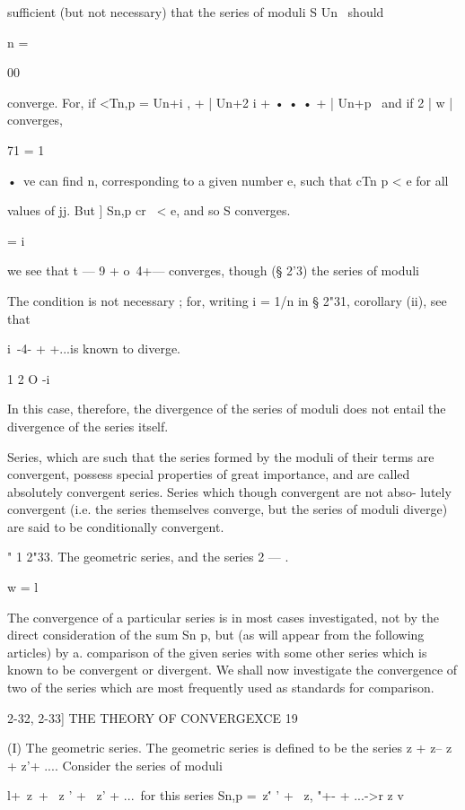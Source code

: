 sufficient (but not necessary) that the series of moduli S Un \ should

n = \

00

converge. For, if <Tn,p = Un+i , + | Un+2 i + • • • + | Un+p \ and if
2 | w | converges,

71 = 1

•\ ve can find n, corresponding to a given number e, such that cTn p <
e for all

values of jj. But ] Sn,p cr \ < e, and so S converges.

  = i



we see that t — 9 + o~4+--- converges, though (§ 2'3) the series of
moduli



The condition is not necessary ; for, writing i = 1/n in § 2"31,
corollary (ii), see that

i\ -4- + +...is known to diverge.

1 2 O -i

In this case, therefore, the divergence of the series of moduli does
not entail the divergence of the series itself.

Series, which are such that the series formed by the moduli of their
terms are convergent, possess special properties of great importance,
and are called absolutely convergent series. Series which though
convergent are not abso- lutely convergent (i.e. the series themselves
converge, but the series of moduli diverge) are said to be
conditionally convergent.

" 1 2"33. The geometric series, and the series 2 — .

w = l

The convergence of a particular series is in most cases investigated,
not by the direct consideration of the sum Sn p, but (as will appear
from the following articles) by a. comparison of the given series with
some other series which is known to be convergent or divergent. We
shall now investigate the convergence of two of the series which are
most frequently used as standards for comparison.



2-32, 2-33] THE THEORY OF CONVERGEXCE 19

(I) The geometric series. The geometric series is defined to be the
series z + z-- z + z'+ .... Consider the series of moduli

l+\ z\ + \ z ' + \ z' + ...\ for this series Sn,p =\ z\'' ' + \ z, "+-
+ ...->r z v

